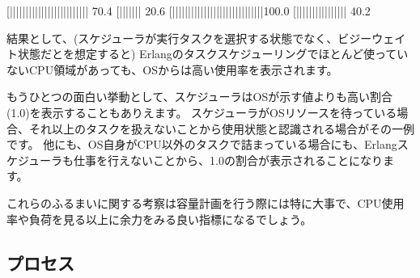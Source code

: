 \begin{VerbatimText}
[|||||||||||||||||||||||||     70.4%
[|||||||                       20.6%
[|||||||||||||||||||||||||||||100.0%
[||||||||||||||||              40.2%
\end{VerbatimText}

結果として、(スケジューラが実行タスクを選択する状態でなく、ビジーウェイト状態だとを想定すると) Erlangのタスクスケジューリングでほとんど使っていないCPU領域があっても、OSからは高い使用率を表示されます。 

もうひとつの面白い挙動として、スケジューラはOSが示す値よりも高い割合(1.0)を表示することもありえます。
スケジューラがOSリソースを待っている場合、それ以上のタスクを扱えないことから使用状態と認識される場合がその一例です。
他にも、OS自身がCPU以外のタスクで詰まっている場合にも、Erlangスケジューラも仕事を行えないことから、1.0の割合が表示されることになります。 

これらのふるまいに関する考察は容量計画を行う際には特に大事で、CPU使用率や負荷を見る以上に余力をみる良い指標になるでしょう。 


\subsection{プロセス}
\label{subsec:global-procs}

